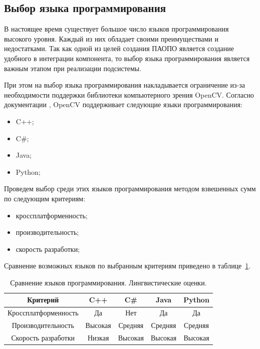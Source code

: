 \subsection{Выбор языка программирования}

В настоящее время существует большое число  языков программирования высокого уровня. Каждый из них обладает своими преимуществами и недостатками. Так как одной из целей создания ПАОПО является создание удобного в интеграции компонента, то выбор языка программирования является важным этапом при реализации подсистемы. 

При этом на выбор языка программирования накладывается ограничение из-за необходимости поддержки библиотеки компьютерного зрения  OpenCV. Согласно документации \cite{OpenCVBook}, OpenCV поддерживает следующие языки программирования:
\begin{itemize}
\item C++;
\item C\#;
\item Java;
\item Python;
\end{itemize}

Проведем выбор среди этих языков программирования методом взвешенных сумм по следующим критериям:
\begin{itemize}
\item кроссплатформенность;
\item производительность;
\item скорость разработки;
\end{itemize}

Сравнение возможных языков по выбранным критериям приведено в таблице~\ref{tab:PLLingvo}.

\begin{table}[!htb]
	\caption{Сравнение языков программирования. Лингвистические оценки.}\label{tab:PLLingvo}
    \centering
	\begin{tabular}{|c|c|c|c|c|}
	\hline 
	Критерий & C++ & C\# & Java & Python \\ 
	\hline 
	Кроссплатформенность & Да & Нет & Да & Да \\ 
	\hline 
	Производительность & Высокая & Средняя & Средняя & Средняя \\ 
	\hline 
	Скорость разработки & Низкая & Высокая & Высокая & Высокая \\ 
	\hline 
	\end{tabular} 
    		
\end{table}

